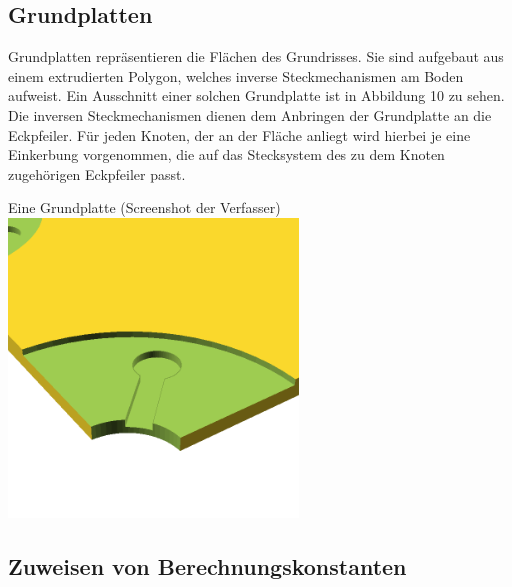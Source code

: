 \subsection{Grundplatten}
Grundplatten repräsentieren die Flächen des Grundrisses.
Sie sind aufgebaut aus einem extrudierten Polygon, welches inverse Steckmechanismen am Boden aufweist.
Ein Ausschnitt einer solchen Grundplatte ist in Abbildung 10 zu sehen.
Die inversen Steckmechanismen dienen dem Anbringen der Grundplatte an die Eckpfeiler.
Für jeden Knoten, der an der Fläche anliegt wird hierbei je eine Einkerbung vorgenommen, die auf das Stecksystem des zu dem Knoten zugehörigen Eckpfeiler passt.
\begin{Bild}{Eine Grundplatte (Screenshot der Verfasser)}
	\includegraphics[height=300px]{Bilder/Untereinheit_GP}
\end{Bild}

\subsection{Zuweisen von Berechnungskonstanten}
